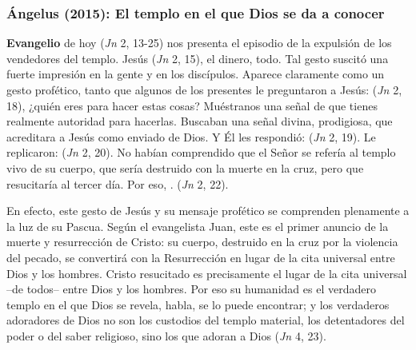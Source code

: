 \label{b2-03-03-2015}

\newpage
\subsubsection{Ángelus (2015): El templo en el que Dios se da a conocer}


\begin{body}
 \textbf{Evangelio} de hoy (\textit{Jn} 2, 13-25) nos presenta el episodio de la expulsión de los vendedores del templo. Jesús  (\textit{Jn} 2, 15), el dinero, todo. Tal gesto suscitó una fuerte impresión en la gente y en los discípulos. Aparece claramente como un gesto profético, tanto que algunos de los presentes le preguntaron a Jesús:  (\textit{Jn} 2, 18), ¿quién eres para hacer estas cosas? Muéstranos una señal de que tienes realmente autoridad para hacerlas. Buscaban una señal divina, prodigiosa, que acreditara a Jesús como enviado de Dios. Y Él les respondió:  (\textit{Jn} 2, 19). Le replicaron:  (\textit{Jn} 2, 20). No habían comprendido que el Señor se refería al templo vivo de su cuerpo, que sería destruido con la muerte en la cruz, pero que resucitaría al tercer día. Por eso, .  (\textit{Jn} 2, 22).

En efecto, este gesto de Jesús y su mensaje profético se comprenden plenamente a la luz de su Pascua. Según el evangelista Juan, este es el primer anuncio de la muerte y resurrección de Cristo: su cuerpo, destruido en la cruz por la violencia del pecado, se convertirá con la Resurrección en lugar de la cita universal entre Dios y los hombres. Cristo resucitado es precisamente el lugar de la cita universal –de todos– entre Dios y los hombres. Por eso su humanidad es el verdadero templo en el que Dios se revela, habla, se lo puede encontrar; y los verdaderos adoradores de Dios no son los custodios del templo material, los detentadores del poder o del saber religioso, sino los que adoran a Dios  (\textit{Jn} 4, 23).


\end{body}
